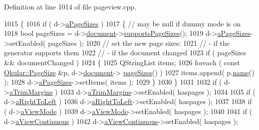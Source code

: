 Definition at line 1014 of file pageview.\+cpp.


\begin{DoxyCode}
1015 \{
1016     \textcolor{keywordflow}{if} ( d->\hyperlink{classPageViewPrivate_a5f864847956ada5d8933fe2d28bbc075}{aPageSizes} )
1017     \{ \textcolor{comment}{// may be null if dummy mode is on}
1018         \textcolor{keywordtype}{bool} pageSizes = d->\hyperlink{classPageViewPrivate_a50645b9853306cffd74e51efb677e5b4}{document}->\hyperlink{classOkular_1_1Document_abda5404bb65d7bc671494e589dec3aaf}{supportsPageSizes}();
1019         d->\hyperlink{classPageViewPrivate_a5f864847956ada5d8933fe2d28bbc075}{aPageSizes}->setEnabled( pageSizes );
1020         \textcolor{comment}{// set the new page sizes:}
1021         \textcolor{comment}{// - if the generator supports them}
1022         \textcolor{comment}{// - if the document changed}
1023         \textcolor{keywordflow}{if} ( pageSizes && documentChanged )
1024         \{
1025             QStringList items;
1026             \textcolor{keywordflow}{foreach} ( \textcolor{keyword}{const} \hyperlink{classOkular_1_1PageSize}{Okular::PageSize} &p, d->\hyperlink{classPageViewPrivate_a50645b9853306cffd74e51efb677e5b4}{document}->
      \hyperlink{classOkular_1_1Document_ab27493b7a9aafe7e9bf7fe2d8e291703}{pageSizes}() )
1027                 items.append( p.\hyperlink{classOkular_1_1PageSize_a2083857cd82db104198342e4897862e4}{name}() );
1028             d->\hyperlink{classPageViewPrivate_a5f864847956ada5d8933fe2d28bbc075}{aPageSizes}->setItems( items );
1029         \}
1030     \}
1031 
1032     \textcolor{keywordflow}{if} ( d->\hyperlink{classPageViewPrivate_a0ef5e6fe307660bd3fbe6bd999b895a7}{aTrimMargins} )
1033         d->\hyperlink{classPageViewPrivate_a0ef5e6fe307660bd3fbe6bd999b895a7}{aTrimMargins}->setEnabled( haspages );
1034 
1035     \textcolor{keywordflow}{if} ( d->\hyperlink{classPageViewPrivate_a4f801cbeb2d2c5bb5cccd84f373aeec9}{aRightToLeft} )
1036         d->\hyperlink{classPageViewPrivate_a4f801cbeb2d2c5bb5cccd84f373aeec9}{aRightToLeft}->setEnabled( haspages );
1037 
1038     \textcolor{keywordflow}{if} ( d->\hyperlink{classPageViewPrivate_a89d998dea21b24010b2578c6b4f5d9d2}{aViewMode} )
1039         d->\hyperlink{classPageViewPrivate_a89d998dea21b24010b2578c6b4f5d9d2}{aViewMode}->setEnabled( haspages );
1040 
1041     \textcolor{keywordflow}{if} ( d->\hyperlink{classPageViewPrivate_a9b68e639f07533308f37c0e1654a9c9a}{aViewContinuous} )
1042         d->\hyperlink{classPageViewPrivate_a9b68e639f07533308f37c0e1654a9c9a}{aViewContinuous}->setEnabled( haspages );

\end{DoxyCode}
